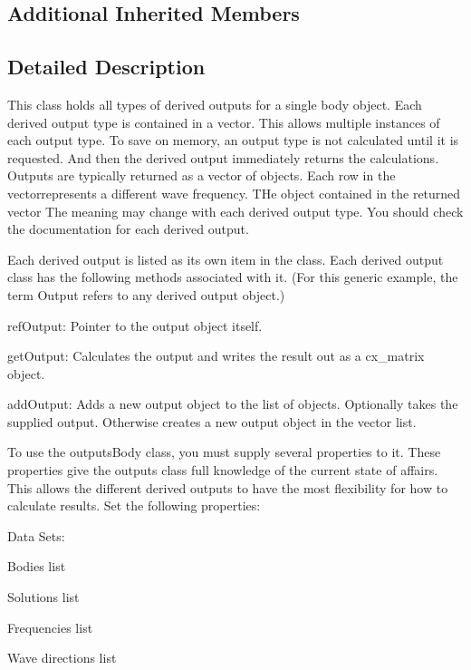 \subsection*{Additional Inherited Members}


\subsection{Detailed Description}
This class holds all types of derived outputs for a single body object. Each derived output type is contained in a vector. This allows multiple instances of each output type. To save on memory, an output type is not calculated until it is requested. And then the derived output immediately returns the calculations. Outputs are typically returned as a vector of objects. Each row in the vectorrepresents a different wave frequency. T\-He object contained in the returned vector The meaning may change with each derived output type. You should check the documentation for each derived output.

Each derived output is listed as its own item in the class. Each derived output class has the following methods associated with it. (For this generic example, the term Output refers to any derived output object.)
\begin{DoxyEnumerate}
\item ref\-Output\-: Pointer to the output object itself.
\item get\-Output\-: Calculates the output and writes the result out as a cx\-\_\-matrix object.
\item add\-Output\-: Adds a new output object to the list of objects. Optionally takes the supplied output. Otherwise creates a new output object in the vector list.
\end{DoxyEnumerate}

To use the outputs\-Body class, you must supply several properties to it. These properties give the outputs class full knowledge of the current state of affairs. This allows the different derived outputs to have the most flexibility for how to calculate results. Set the following properties\-:

Data Sets\-:
\begin{DoxyEnumerate}
\item Bodies list
\item Solutions list
\item Frequencies list
\item Wave directions list
\end{DoxyEnumerate}

